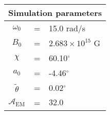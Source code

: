 \begin{tabular}{ccl}
\multicolumn{3}{c}{Simulation parameters} \\
\hline
$\omega_0$  &=& 15.0 rad/s\\
$B_0$  &=& ${2.683}\times 10^{15}$ G \\
$\chi$  &=& 60.10$^{\circ}$ \\
$a_0$ &=& -4.46$^{\circ}$ \\
$\tilde{\theta}$ &= & 0.02$^{\circ}$ \\
$\mathcal{A}_{\mathrm{EM}}$ &= & $32.0$
\end{tabular}